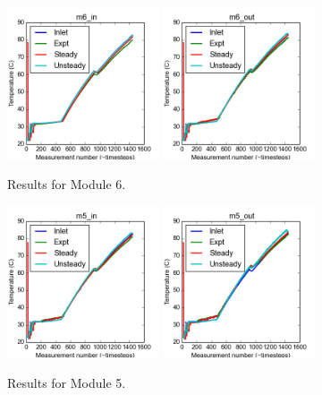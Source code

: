 \documentclass{article}
\begin{document}
\begin{figure}[!ht]
\centering
\includegraphics[width=0.4\textwidth]{../../data/ICSolar/images/Feb28_m6_in_compare.png}\hspace{0.05\textwidth}
\includegraphics[width=0.4\textwidth]{../../data/ICSolar/images/Feb28_m6_out_compare.png}\hspace{0.05\textwidth}\\
\caption{Results for Module 6.}\end{figure}
\begin{figure}[!ht]
\centering
\includegraphics[width=0.4\textwidth]{../../data/ICSolar/images/Feb28_m5_in_compare.png}\hspace{0.05\textwidth}
\includegraphics[width=0.4\textwidth]{../../data/ICSolar/images/Feb28_m5_out_compare.png}\hspace{0.05\textwidth}\\
\caption{Results for Module 5.}\end{figure}
\end{document}
